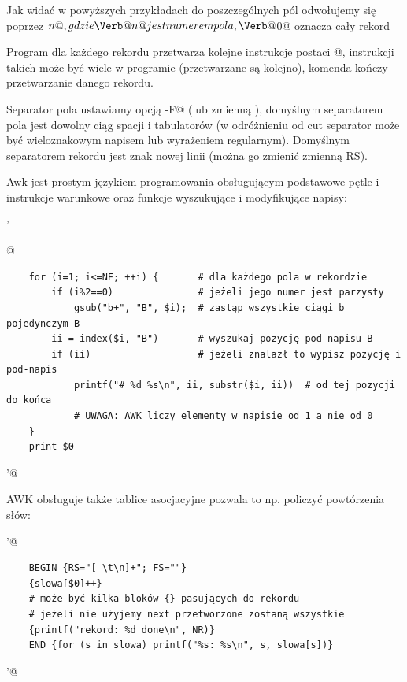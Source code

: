 Jak widać w powyższych przykładach do poszczególnych pól odwołujemy
się poprzez \Verb@$n@, gdzie \Verb@n@ jest numerem pola, \Verb@$0@ oznacza cały rekord

Program dla każdego rekordu przetwarza kolejne instrukcje postaci
@, instrukcji takich może być wiele w programie
(przetwarzane są kolejno), komenda \Verb@next@ kończy przetwarzanie danego rekordu.

Separator pola ustawiamy opcją \Verb@-F@ (lub zmienną \Verb@FS@), domyślnym separatorem
pola jest dowolny ciąg spacji i tabulatorów (w odróżnieniu od cut
separator może być wieloznakowym napisem lub wyrażeniem regularnym).
Domyślnym separatorem rekordu jest znak nowej linii (można go zmienić zmienną RS).

Awk jest prostym językiem programowania obsługującym podstawowe pętle
i instrukcje warunkowe oraz funkcje wyszukujące i modyfikujące napisy:

\begin{oframed}\noindent{}\Verb@ '{@\vspace{-0.95em}
\begin{verbatim}
	for (i=1; i<=NF; ++i) {       # dla każdego pola w rekordzie
		if (i%2==0)               # jeżeli jego numer jest parzysty
			gsub("b+", "B", $i);  # zastąp wszystkie ciągi b pojedynczym B
		ii = index($i, "B")       # wyszukaj pozycję pod-napisu B
		if (ii)                   # jeżeli znalazł to wypisz pozycję i pod-napis
			printf("# %d %s\n", ii, substr($i, ii))  # od tej pozycji do końca
			# UWAGA: AWK liczy elementy w napisie od 1 a nie od 0
	}
	print $0
\end{verbatim}
\vspace{-0.95em}\Verb@}'@\end{oframed}

\noindent
AWK obsługuje także tablice asocjacyjne pozwala to np. policzyć powtórzenia słów:

\begin{oframed}\noindent{}\Verb@ '@\vspace{-0.95em}
\begin{verbatim}
	BEGIN {RS="[ \t\n]+"; FS=""}
	{slowa[$0]++}
	# może być kilka bloków {} pasujących do rekordu
	# jeżeli nie użyjemy next przetworzone zostaną wszystkie
	{printf("rekord: %d done\n", NR)}
	END {for (s in slowa) printf("%s: %s\n", s, slowa[s])}
\end{verbatim}
\vspace{-0.95em}\Verb@'@\end{oframed}

